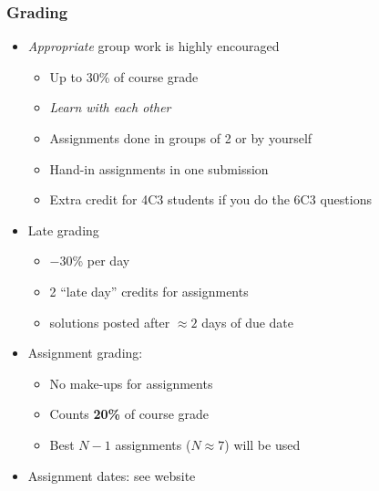 \begin{frame}\frametitle{Grading}
	\begin{itemize}
		\item	\emph{Appropriate} group work is highly encouraged 
		\begin{itemize}
			\item	Up to 30\% of course grade 
			\item	\emph{Learn with each other} 
			\item	Assignments done in groups of 2 or by yourself 
			\item	Hand-in assignments in one submission 
			\item	Extra credit for 4C3 students if you do the 6C3 questions
		\end{itemize}
		\item	Late grading 
		\begin{itemize}
			\item	\( -30 \)\% per day
			\item	2 ``late day'' credits for assignments 
			\item	solutions posted after $\approx 2$ days of due date 
		\end{itemize}
		\item	Assignment grading: 
		\begin{itemize}
			\item	No make-ups for assignments 
			\item	Counts \textbf{20\%} of course grade 
			\item	Best $N-1$ assignments ($N \approx 7$) will be used 
		\end{itemize}
		\item	Assignment dates: see website 
	\end{itemize}
\end{frame}


